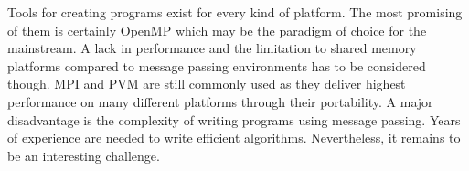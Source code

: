 Tools for creating programs exist for every kind of platform. The most
promising of them is certainly OpenMP which may be the paradigm of
choice for the mainstream. A lack in performance and the limitation to
shared memory platforms compared to message
passing environments has to be considered though. MPI and PVM are
still commonly used as they deliver highest performance on many
different platforms through their portability. A major disadvantage is
the complexity of writing programs using message passing. Years of
experience are needed to write efficient algorithms. Nevertheless, it
remains to be an interesting challenge.